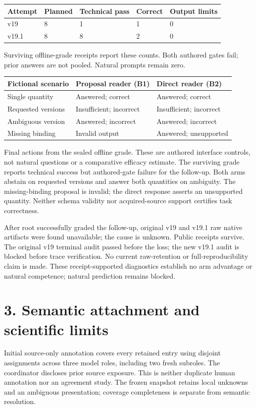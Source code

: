 \documentclass[10pt,a4paper]{article}
\begin{document}
\begin{longtable}{@{}p{}p{}p{}p{}p{}@{}}\toprule
\textbf{Attempt} & \textbf{Planned} & \textbf{Technical pass} & \textbf{Correct} & \textbf{Output limits} \\ \midrule\endhead
v19 & 8 & 1 & 1 & 0 \\
v19.1 & 8 & 8 & 2 & 0 \\
\bottomrule\end{longtable}
{\small Surviving offline-grade receipts report these counts. Both authored gates fail; prior answers are not pooled. Natural prompts remain zero.}
\begin{longtable}{@{}p{}p{}p{}@{}}\toprule
\textbf{Fictional scenario} & \textbf{Proposal reader (B1)} & \textbf{Direct reader (B2)} \\ \midrule\endhead
Single quantity & Answered; correct & Answered; correct \\
Requested versions & Insufficient; incorrect & Insufficient; incorrect \\
Ambiguous version & Answered; incorrect & Answered; incorrect \\
Missing binding & Invalid output & Answered; unsupported \\
\bottomrule\end{longtable}
{\small Final actions from the sealed offline grade. These are authored interface controls, not natural questions or a comparative efficacy estimate.}
The surviving grade reports technical success but authored-gate failure for the follow-up. Both arms abstain on requested versions and answer both quantities on ambiguity. The missing-binding proposal is invalid; the direct response asserts an unsupported quantity. Neither schema validity nor acquired-source support certifies task correctness.

After root successfully graded the follow-up, original v19 and v19.1 raw native artifacts were found unavailable; the cause is unknown. Public receipts survive. The original v19 terminal audit passed before the loss; the new v19.1 audit is blocked before trace verification. No current raw-retention or full-reproducibility claim is made. These receipt-supported diagnostics establish no arm advantage or natural competence; natural prediction remains blocked.

\clearpage
\section*{3. Semantic attachment and scientific limits}
Initial source-only annotation covers every retained entry using disjoint assignments across three model roles, including two fresh subroles. The coordinator discloses prior source exposure. This is neither duplicate human annotation nor an agreement study. The frozen snapshot retains local unknowns and an ambiguous presentation; coverage completeness is separate from semantic resolution.
\end{document}
